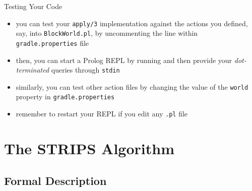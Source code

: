 \documentclass[presentation]{beamer}\mode<presentation>{\usetheme{AMSBolognaFC}}
\begin{document}
\begin{frame}[c]{Testing Your Code}

    \begin{itemize}
        \item you can test your \texttt{apply/3} implementation against the actions you defined, say, into \texttt{BlockWorld.pl}, by uncommenting the line
        within \texttt{gradle.properties} file

        \vfill

        \item then, you can start a Prolog REPL by running
        and then provide your \emph{dot-terminated} queries through \texttt{stdin}

        \vfill

        \item similarly, you can test other action files by changing the value of the \texttt{world} property in \texttt{gradle.properties}

        \vfill

        \item remember to restart your REPL if you edit any \texttt{.pl} file
    \end{itemize}

\end{frame}


\section{The STRIPS Algorithm}

\subsection{Formal Description}
\end{document}
